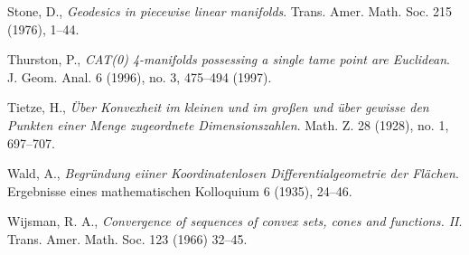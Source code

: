 \begin{thebibliography}{52}
Stone, D.,
\textit{Geodesics in piecewise linear manifolds}.
Trans. Amer. Math. Soc. 
215 
(1976), 
1--44.

 Thurston, P.,
\textit{CAT(0) 4-manifolds possessing a single tame point are Euclidean}. 
J. Geom. Anal. 
6 (1996), 
no. 3, 
475--494 (1997). 

 Tietze, H.,
\emph{\"Uber Konvexheit im kleinen und im gro\ss{}en und \"uber gewisse den Punkten einer Menge zugeordnete Dimensionszahlen}.
Math. Z. 28 (1928), no. 1, 697--707. 

 Wald, A., \textit{Begr\"undung eiiner Koordinatenlosen Differentialgeometrie der Fl\"achen}.
Ergebnisse eines mathematischen Kolloquium
6  (1935), 24--46.

 Wijsman, R. A., 
\textit{Convergence of sequences of convex sets, cones and functions. II}. 
Trans. Amer. Math. Soc. 
123 (1966) 32--45.


\end{thebibliography}
